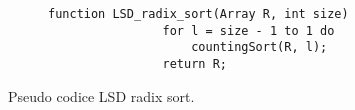 \documentclass{subfiles}
\begin{document}
\begin{figure}[h!]
    \centering
    \begin{subfigure}[b]{.55\textwidth}
        \begin{lstlisting}[language = PSEUDO]
                function LSD_radix_sort(Array R, int size)
                for l = size - 1 to 1 do 
                    countingSort(R, l);
                return R;
            \end{lstlisting}
    \end{subfigure}
    \caption{Pseudo codice LSD radix sort.}
    \label{Fig:6}
\end{figure}
\end{document}
